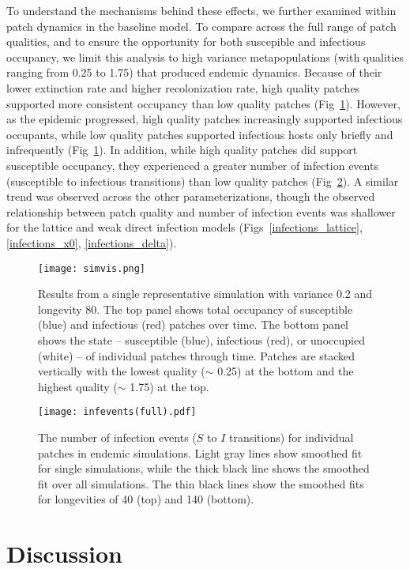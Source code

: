 \documentclass{svjour3}
\begin{document}
To understand the mechanisms behind these effects, we further examined within patch dynamics in the baseline model.  To compare across the full range of patch qualities, and to ensure the opportunity for both suscepible and infectious occupancy, we limit this analysis to high variance metapopulations (with qualities ranging from 0.25 to 1.75) that produced endemic dynamics.  Because of their lower extinction rate and higher recolonization rate, high quality patches supported more consistent occupancy than low quality patches (Fig~\ref{simvis}).  However, as the epidemic progressed, high quality patches increasingly supported infectious occupants, while low quality patches supported infectious hosts only briefly and infrequently (Fig~\ref{simvis}).  In addition, while high quality patches did support susceptible occupancy, they experienced a greater number of infection events (susceptible to infectious transitions) than low quality patches (Fig~\ref{infections}).  A similar trend was observed across the other parameterizations, though the observed relationship between patch quality and number of infection events was shallower for the lattice and weak direct infection models (Figs~\ref{infections_lattice}, \ref{infections_x0}, \ref{infections_delta}).

\begin{figure}
\centering
\texttt{[image: simvis.png]}
\caption{Results from a single representative simulation with variance 0.2 and longevity 80.  The top panel shows total occupancy of susceptible (blue) and infectious (red) patches over time.  The bottom panel shows the state -- susceptible (blue), infectious (red), or unoccupied (white) -- of individual patches through time.  Patches are stacked vertically with the lowest quality ($\sim$ 0.25) at the bottom and the highest quality ($\sim$ 1.75) at the top.}
\label{simvis}
\end{figure}


\begin{figure}
\centering
\texttt{[image: infevents(full).pdf]}
\caption{The number of infection events ($S$ to $I$ transitions) for individual patches in endemic simulations.  Light gray lines show smoothed fit for single simulations, while the thick black line shows the smoothed fit over all simulations.  The thin black lines show the smoothed fits for longevities of 40 (top) and 140 (bottom).}
\label{infections}
\end{figure}


\section{Discussion}
\label{discussion} 
\end{document}
